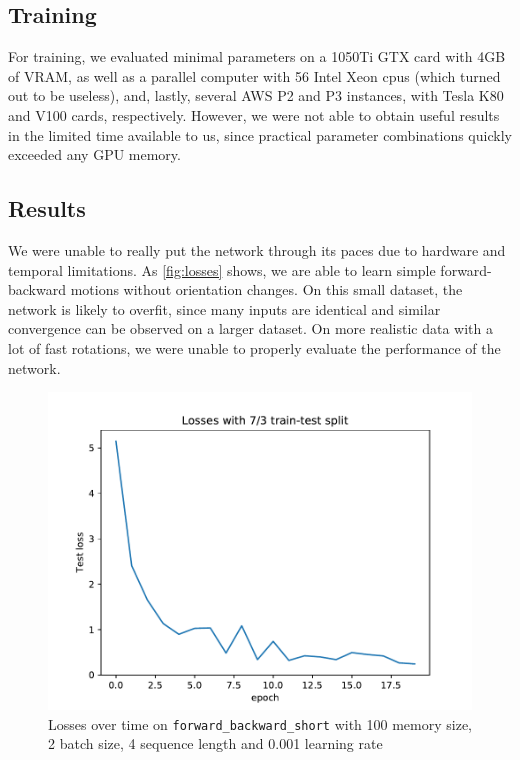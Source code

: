 \documentclass[a4paper,11pt]{article}
\begin{document}
\subsection{Training}
\label{sec:evaluation:training}

For training, we evaluated minimal parameters on a 1050Ti GTX card with 4GB of
VRAM, as well as a parallel computer with 56 Intel Xeon cpus (which turned out
to be useless), and, lastly, several AWS P2 and P3 instances, with Tesla K80 and
V100 cards, respectively. However, we were not able to obtain useful results in
the limited time available to us, since practical parameter combinations quickly
exceeded any GPU memory.


\subsection{Results}
\label{sec:evaluation:results}

We were unable to really put the network through its paces due to hardware and
temporal limitations. As \autoref{fig:losses} shows, we are able to learn simple
forward-backward motions without orientation changes. On this small dataset, the
network is likely to overfit, since many inputs are identical and similar convergence can be
observed on a larger dataset. On more realistic data with a lot of fast
rotations, we were unable to properly evaluate the performance of the network.

\begin{figure}
    \centering
    \includegraphics[width=0.8\linewidth]{losses.pdf}
    \caption{Losses over time on \texttt{forward\_backward\_short} with 100
    memory size, 2 batch size, 4 sequence length and 0.001 learning rate}
    \label{fig:losses}
\end{figure}
\end{document}
